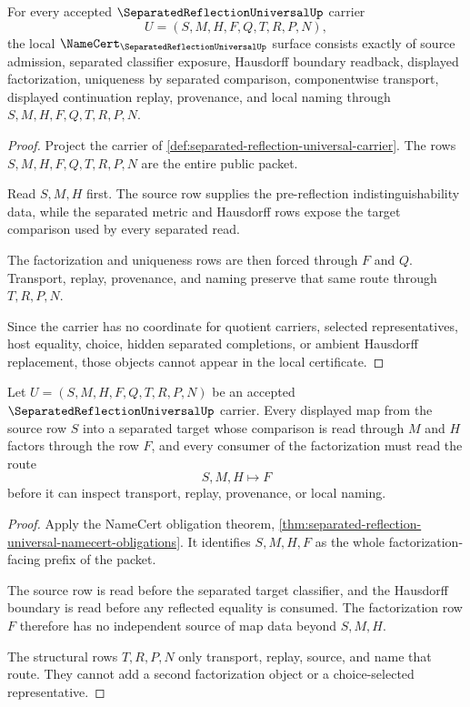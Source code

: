\begin{theorem}
\label{thm:separated-reflection-universal-namecert-obligations}
For every accepted $\SeparatedReflectionUniversalUp$ carrier
$$
U=(S,M,H,F,Q,T,R,P,N),
$$
the local $\NameCert_{\SeparatedReflectionUniversalUp}$ surface consists exactly of source admission, separated classifier exposure, Hausdorff boundary readback, displayed factorization, uniqueness by separated comparison, componentwise transport, displayed continuation replay, provenance, and local naming through $S,M,H,F,Q,T,R,P,N$.
\end{theorem}
\begin{proof}
Project the carrier of \autoref{def:separated-reflection-universal-carrier}. The rows $S,M,H,F,Q,T,R,P,N$ are the entire public packet.

Read $S,M,H$ first. The source row supplies the pre-reflection indistinguishability data, while the separated metric and Hausdorff rows expose the target comparison used by every separated read.

The factorization and uniqueness rows are then forced through $F$ and $Q$. Transport, replay, provenance, and naming preserve that same route through $T,R,P,N$.

Since the carrier has no coordinate for quotient carriers, selected representatives, host equality, choice, hidden separated completions, or ambient Hausdorff replacement, those objects cannot appear in the local certificate.
\end{proof}

\begin{theorem}
\label{thm:separated-reflection-universal-factorization}
Let $U=(S,M,H,F,Q,T,R,P,N)$ be an accepted $\SeparatedReflectionUniversalUp$ carrier. Every displayed map from the source row $S$ into a separated target whose comparison is read through $M$ and $H$ factors through the row $F$, and every consumer of the factorization must read the route
$$
S,M,H\longmapsto F
$$
before it can inspect transport, replay, provenance, or local naming.
\end{theorem}
\begin{proof}
Apply the NameCert obligation theorem, \autoref{thm:separated-reflection-universal-namecert-obligations}. It identifies $S,M,H,F$ as the whole factorization-facing prefix of the packet.

The source row is read before the separated target classifier, and the Hausdorff boundary is read before any reflected equality is consumed. The factorization row $F$ therefore has no independent source of map data beyond $S,M,H$.

The structural rows $T,R,P,N$ only transport, replay, source, and name that route. They cannot add a second factorization object or a choice-selected representative.
\end{proof}

